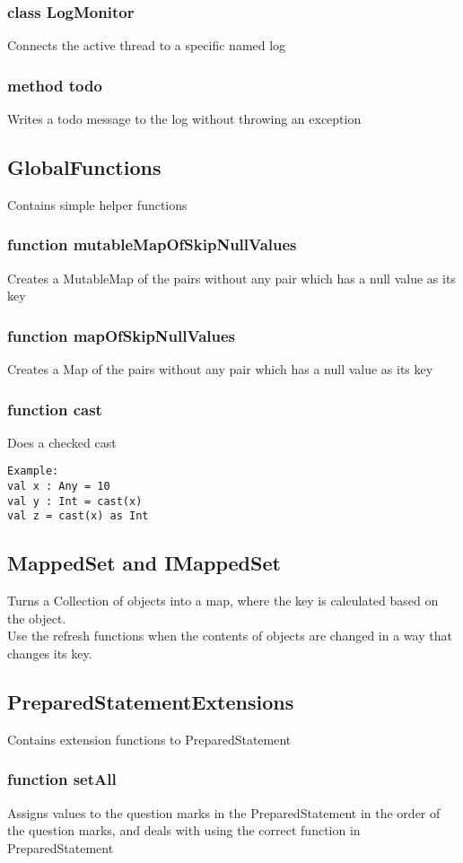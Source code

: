 \documentclass{article}
\begin{document}
\subsubsection{class LogMonitor}
Connects the active thread to a specific named log
\subsubsection{method todo}
Writes a todo message to the log without throwing an exception
\subsection{GlobalFunctions}
Contains simple helper functions
\subsubsection{function mutableMapOfSkipNullValues}
Creates a MutableMap of the pairs without any pair which has a null value as its key
\subsubsection{function mapOfSkipNullValues}
Creates a Map of the pairs without any pair which has a null value as its key
\subsubsection{function cast}
Does a checked cast\\
\begin{verbatim}
Example:
val x : Any = 10
val y : Int = cast(x)
val z = cast(x) as Int    
\end{verbatim}
\subsection{MappedSet and IMappedSet}
Turns a Collection of objects into a map, where the key is calculated based on the object.\\
Use the refresh functions when the contents of objects are changed in a way that changes its key.
\subsection{PreparedStatementExtensions}
Contains extension functions to PreparedStatement
\subsubsection{function setAll}
Assigns values to the question marks in the PreparedStatement in the order of the question marks, and deals with using the correct function in PreparedStatement
\end{document}
